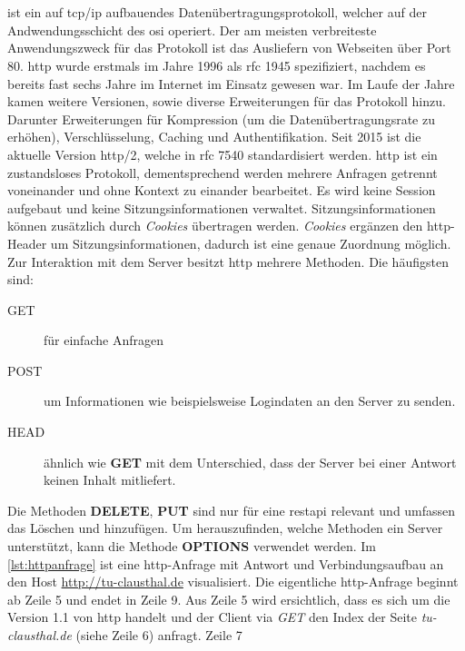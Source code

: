 \documentclass[titlepage]{report}
\begin{document}
\section*{}
 ist ein auf \gls{tcp}/\gls{ip} aufbauendes
Datenübertragungsprotokoll, welcher auf der Andwendungsschicht des
\gls{osi} operiert. Der am meisten verbreiteste Anwendungszweck für das
Protokoll ist das Ausliefern von Webseiten über Port 80. \gls{http}
wurde erstmals im Jahre 1996 als \gls{rfc} 1945 spezifiziert, nachdem
es bereits fast sechs Jahre im Internet im Einsatz gewesen
war\cite{RFC1945}. Im Laufe der Jahre kamen weitere Versionen,
sowie diverse Erweiterungen für das Protokoll hinzu. Darunter
Erweiterungen für Kompression (um die Datenübertragungsrate zu erhöhen),
Verschlüsselung, Caching und Authentifikation. Seit 2015 ist die
aktuelle Version \gls{http}/2, welche in \gls{rfc} 7540 standardisiert
werden\cite{RFC7540}. \gls{http} ist ein zustandsloses Protokoll,
dementsprechend werden mehrere Anfragen getrennt voneinander und ohne
Kontext zu einander bearbeitet. Es wird keine Session aufgebaut und
keine Sitzungsinformationen verwaltet. Sitzungsinformationen können
zusätzlich durch \emph{Cookies} übertragen werden. \emph{Cookies}
ergänzen den \gls{http}\hyp{}Header um Sitzungsinformationen, dadurch
ist eine genaue Zuordnung möglich. Zur Interaktion mit dem Server
besitzt \gls{http} mehrere Methoden. Die häufigsten sind:
\begin{description}
    \item[GET] für einfache Anfragen
    \item[POST] um Informationen wie beispielsweise Logindaten an den
        Server zu senden.
    \item[HEAD] ähnlich wie \textbf{GET} mit dem Unterschied, dass
        der Server bei einer Antwort keinen Inhalt mitliefert.
\end{description}
Die Methoden \textbf{DELETE}, \textbf{PUT} sind nur für eine
\gls{restapi} relevant und umfassen das Löschen und hinzufügen. Um
herauszufinden, welche Methoden ein Server unterstützt, kann die Methode
\textbf{OPTIONS} verwendet werden.
Im \autoref{lst:httpanfrage} ist eine \gls{http}\hyp{}Anfrage mit Antwort und
Verbindungsaufbau an den Host \url{http://tu-clausthal.de}
visualisiert. Die eigentliche \gls{http}\hyp{}Anfrage beginnt ab Zeile 5
und endet in Zeile 9. Aus Zeile 5 wird ersichtlich, dass es sich um die
Version 1.1 von \gls{http} handelt und der Client via \emph{GET} den
Index der Seite \emph{tu-clausthal.de} (siehe Zeile 6) anfragt. Zeile 7
\end{document}
